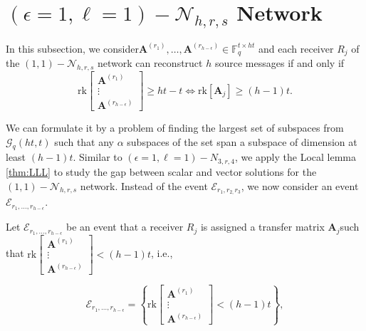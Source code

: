\section{$\left(\epsilon=1,\ell=1\right)-\mathcal{N}_{h,r,s}$ Network \label{sec:e1l1_nw}}

In this subsection, we consider$\boldsymbol{A}^{\left(r_{1}\right)},\ldots,\boldsymbol{A}^{\left(r_{h-\epsilon}\right)}\in\ensuremath{\mathbb{F}}_{q}^{t\times ht}$
and each receiver $R_{j}$ of the $\left(1,1\right)-\mathcal{N}_{h,r,s}$
network can reconstruct $h$ source messages if and only if
\[
\mathrm{rk}\left[\begin{array}{c}
\boldsymbol{A}^{\left(r_{1}\right)}\\
\vdots\\
\boldsymbol{A}^{\left(r_{h-\epsilon}\right)}
\end{array}\right]\geq ht-t\Leftrightarrow\mathrm{rk}\left[\boldsymbol{A}_{j}\right]\geq(h-1)t.
\]

We can formulate it by a problem of finding the largest set of subspaces
from $\mathcal{G}_{q}\left(ht,t\right)$ such that any $\alpha$ subspaces
of the set span a subspace of dimension at least $\left(h-1\right)t$.
Similar to $\left(\epsilon=1,\ell=1\right)-\ensuremath{N}_{3,r,4}$,
we apply the Local lemma \ref{thm:LLL} to study the gap between scalar
and vector solutions for the $\left(1,1\right)-\mathcal{N}_{h,r,s}$
network. Instead of the event $\mathcal{E}_{r_{1},r_{2,}r_{3}}$,
we now consider an event $\mathcal{E}_{r_{1},\ldots,r_{h-\epsilon}}$.

Let $\mathcal{E}_{r_{1},\ldots,r_{h-\epsilon}}$ be an event that
a receiver $R_{j}$ is assigned a transfer matrix $\boldsymbol{A}_{j}$such
that $\mathrm{rk}\left[\begin{array}{c}
\boldsymbol{A}^{\left(r_{1}\right)}\\
\vdots\\
\boldsymbol{A}^{\left(r_{h-\epsilon}\right)}
\end{array}\right]<(h-1)t$, i.e.,

\[
\mathcal{E}_{r_{1},\ldots,r_{h-\epsilon}}=\left\{ \mathrm{rk}\left[\begin{array}{c}
\boldsymbol{A}^{\left(r_{1}\right)}\\
\vdots\\
\boldsymbol{A}^{\left(r_{h-\epsilon}\right)}
\end{array}\right]<(h-1)t\right\} ,
\]


